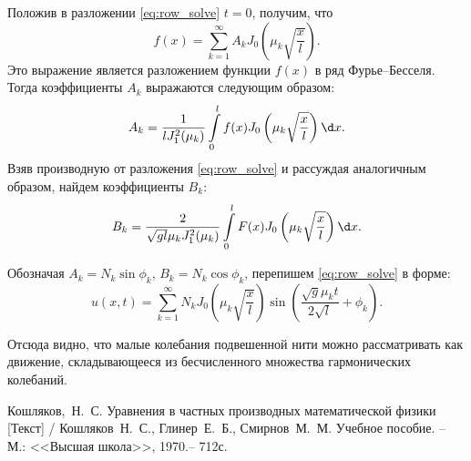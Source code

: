 Положив в разложении \eqref{eq:row_solve} \( t = 0 \), получим, что
\[
    f(x) = \sum\limits_{k = 1}^\infty A_k J_0\left(\mu_k \sqrt{\frac{x}{l}} \right).
\]
Это выражение является разложением функции \( f(x) \) в ряд Фурье--Бесселя. Тогда
коэффициенты \( A_k \) выражаются следующим образом:
\[
    A_k = \frac{1}{l J_1^2(\mu_k)} \int\limits_0^l f(x)J_0\left(\mu_k\sqrt{\frac{x}{l}}\right)\d x.
\]
Взяв производную от разложения \eqref{eq:row_solve} и рассуждая аналогичным
образом, найдем коэффициенты \( B_k \):
\[
    B_k = \frac{2}{\sqrt{gl}\mu_k J_1^2(\mu_k)} \int\limits_0^l F(x)J_0
    \left(\mu_k\sqrt\frac{x}{l}\right)\d x.
\]

Обозначая \( A_k = N_k\sin\phi_k \), \( B_k = N_k\cos\phi_k \), перепишем
\eqref{eq:row_solve} в форме:
\begin{equation}
    u(x, t) = \sum\limits_{k = 1}^\infty N_k J_0\left(\mu_k\sqrt{\frac{x}{l}}\right)
    \sin\left(\frac{\sqrt{g}\mu_kt}{2\sqrt{l}} + \phi_k\right).
    \label{eq:final_solve}
\end{equation}

Отсюда видно, что малые колебания подвешенной нити можно рассматривать
как движение, складывающееся из бесчисленного множества гармонических
колебаний.

\newpage
{}
\begin{thebibliography}{9}
    Кошляков,~Н.~С. Уравнения в частных производных
    математической физики [Текст] / Кошляков~Н.~С., Глинер~Е.~Б., Смирнов~М.~М.
    Учебное пособие. -- М.: <<Высшая школа>>, 1970.-- 712с.
\end{thebibliography}
